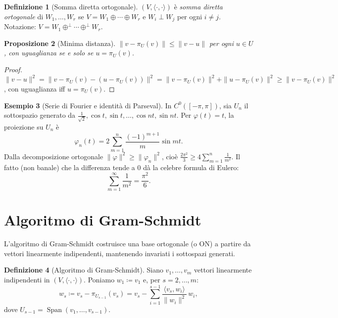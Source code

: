 \documentclass[11pt, a4paper]{book}
\theoremstyle{definition}
\newtheorem{definizione}{Definizione}[section]
\newtheorem{esempio}[definizione]{Esempio}
\theoremstyle{plain}
\newtheorem{proposizione}[definizione]{Proposizione}
\theoremstyle{remark}
\DeclareMathOperator{\Span}{Span}
\begin{document}
\begin{defbox}
\begin{definizione}[Somma diretta ortogonale]
$(V,\langle\cdot,\cdot\rangle)$ è \emph{somma diretta ortogonale} di $W_1,\ldots,W_r$ se $V = W_1 \oplus \cdots \oplus W_r$ e $W_i \perp W_j$ per ogni $i \neq j$. Notazione: $V = W_1 \oplus^\perp \cdots \oplus^\perp W_r$.
\end{definizione}
\end{defbox}

\begin{proposizione}[Minima distanza]
\label{prop:minima-distanza}
$\|v - \pi_U(v)\| \leq \|v - u\|$ per ogni $u \in U$, con uguaglianza se e solo se $u = \pi_U(v)$.
\end{proposizione}

\begin{proof}
$\|v-u\|^2 = \|v - \pi_U(v) - (u-\pi_U(v))\|^2 = \|v-\pi_U(v)\|^2 + \|u-\pi_U(v)\|^2 \geq \|v-\pi_U(v)\|^2$, con uguaglianza iff $u = \pi_U(v)$.
\end{proof}

\begin{exbox}
\begin{esempio}[Serie di Fourier e identità di Parseval]
\label{es:fourier}
In $C^0([-\pi,\pi])$, sia $U_n$ il sottospazio generato da $\frac{1}{\sqrt{2}}, \cos t, \sin t, \ldots, \cos nt, \sin nt$. Per $\varphi(t) = t$, la proiezione su $U_n$ è
\[
  \varphi_n(t) = 2\sum_{m=1}^n \frac{(-1)^{m+1}}{m}\sin mt.
\]
Dalla decomposizione ortogonale $\|\varphi\|^2 \geq \|\varphi_n\|^2$, cioè $\frac{2\pi^2}{3} \geq 4\sum_{m=1}^n \frac{1}{m^2}$. Il fatto (non banale) che la differenza tende a $0$ dà la celebre formula di Eulero:
\[
  \sum_{m=1}^\infty \frac{1}{m^2} = \frac{\pi^2}{6}.
\]
\end{esempio}
\end{exbox}

\section{Algoritmo di Gram-Schmidt}
\label{sec:gram-schmidt}

L'algoritmo di Gram-Schmidt costruisce una base ortogonale (o ON) a partire da vettori linearmente indipendenti, mantenendo invariati i sottospazi generati.

\begin{defbox}
\begin{definizione}[Algoritmo di Gram-Schmidt]
Siano $v_1,\ldots,v_m$ vettori linearmente indipendenti in $(V,\langle\cdot,\cdot\rangle)$. Poniamo $w_1 \coloneqq v_1$ e, per $s = 2,\ldots,m$:
\[
  w_s \coloneqq v_s - \pi_{U_{s-1}}(v_s) = v_s - \sum_{i=1}^{s-1}\frac{\langle v_s, w_i\rangle}{\|w_i\|^2}\,w_i,
\]
dove $U_{s-1} = \Span(v_1,\ldots,v_{s-1})$.
\end{definizione}
\end{defbox}
\end{document}
